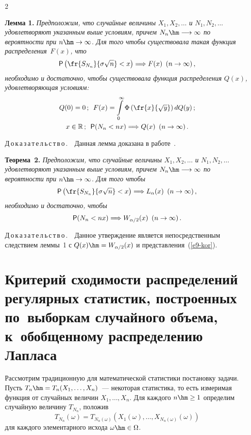 \begin{multicols}{2}
\smallskip

\noindent
\textbf{Лемма 1.} {\it Предположим, что случайные величины
$X_1,X_2,\ldots$ и $N_1,N_2,\ldots$ удовлетворяют указанным выше
условиям, причем $N_n\hm\longrightarrow\infty$ по вероятности при
$n\hm\to\infty$. Для того чтобы существовала такая функция
распределения~$F(x)$, что}
$$
{\sf P}\left(\fr{S_{N_n}}{\sigma\sqrt{n}}<x\right) \Longrightarrow
F(x)\enskip (n\to\infty)\,,
$$
\textit{необходимо и достаточно, чтобы существовала функция распределения
$Q(x)$, удовлетворяющая условиям:}
\begin{gather*}
Q(0)=0\,;\enskip
F(x)=\int\limits_{0}^{\infty}\Phi\left(\fr{x}{\sqrt{y}}\right)dQ(y)\,;\\
x\in\mathbb{R}\,;\enskip {\sf P}(N_n<nx)\Longrightarrow Q(x) \enskip
(n\to\infty)\,.
\end{gather*}


\smallskip

\noindent
Д\,о\,к\,а\,з\,а\,т\,е\,л\,ь\,с\,т\,в\,о\,.\ \ Данная лемма доказана в работе~\cite{Korolev1994}.

\smallskip

\noindent
\textbf{Теорема~2.} {\it Предположим, что случайные величины
$X_1,X_2,\ldots$ и $N_1,N_2,\ldots$ удовлетворяют указанным выше
условиям, причем $N_n\hm\longrightarrow\infty$ по вероятности при
$n\hm\to\infty$. Для того чтобы}
$$
{\sf P}\left(\fr{S_{N_n}}{\sigma\sqrt{n}}<x\right) \Longrightarrow
L_{\alpha}(x)\enskip (n\to\infty)\,,
$$
\textit{необходимо и достаточно, чтобы}
$$
{\sf P}(N_n<nx)\Longrightarrow W_{\alpha/2}(x) \enskip (n\to\infty)\,.
$$



\noindent
Д\,о\,к\,а\,з\,а\,т\,е\,л\,ь\,с\,т\,в\,о\,.\ \ Данное утверждение является
непосредственным следствием леммы~1 с $Q(x)\hm=W_{\alpha/2}(x)$ и
представления~(\ref{e9-kor}).

\vspace*{-4pt}

\section{Критерий сходимости распределений регулярных статистик,
построенных по~выборкам случайного объема, к~обобщенному
распределению Лапласа}

\vspace*{-1pt}

Рассмотрим традиционную для математической статистики постановку
задачи. Пусть $T_n\hm=T_n(X_1,\ldots,X_n)$~--- некоторая статистика, то
есть измеримая функция от случайных величин $X_1,\ldots,X_n$. Для
каждого $n\hm\ge1$ определим случайную величину $T_{N_n}$, положив
$$
T_{N_n}(\omega) = T_{N_n(\omega)}\left(X_1(\omega),\ldots,X_{N_n(\omega)}(\omega)\right)
$$
для каждого элементарного исхода $\omega\hm\in\Omega$.


\end{multicols}

